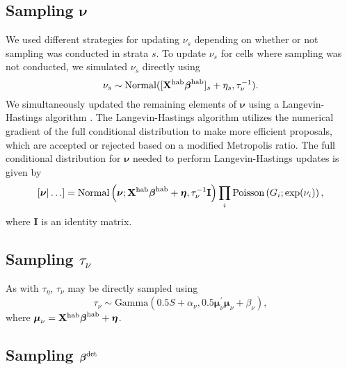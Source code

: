 \documentclass[10pt]{article}
\begin{document}
\subsection*{Sampling $\boldsymbol{\nu}$}
We used different strategies for updating $\nu_s$ depending on whether or not sampling was conducted in strata $s$. To update $\nu_s$ for cells where sampling was not conducted, we simulated $\nu_s$ directly using
$$
\nu_s \sim {\rm Normal}([{\bf X}^{\rm hab} \boldsymbol{\beta}^{\rm hab}]_s+\eta_s,\tau_\nu^{-1}).
$$
We simultaneously updated the remaining elements of $\boldsymbol{\nu}$ using
a Langevin-Hastings algorithm \cite{RobertCasella2004}.  The Langevin-Hastings algorithm utilizes the numerical gradient of the full conditional distribution to make more efficient proposals, which are accepted or rejected based on a modified Metropolis ratio.  The full conditional distribution for $\boldsymbol{\nu}$ needed to perform Langevin-Hastings updates is given by
$$
\left[ \boldsymbol{\nu} | \hdots \right] = \textrm{Normal}\left(\boldsymbol{\nu};{\bf X}^{\rm hab}\boldsymbol{\beta}^{\rm hab}+\boldsymbol{\eta},\tau_\nu^{-1} {\bf I} \right) \prod_i \textrm{Poisson} \left( G_i; \exp(\nu_i) \right),
$$
where {\bf I} is an identity matrix.

\subsection*{Sampling $\tau_\nu$}
As with $\tau_\eta$, $\tau_\nu$ may be directly sampled using
$$
\tau_\nu \sim \textrm{Gamma}\left( 0.5S+\alpha_\nu,0.5\boldsymbol{\mu}_\nu^\prime \boldsymbol{\mu}_\nu+\beta_\nu \right),
$$
where $\boldsymbol{\mu}_\nu={\bf X}^{\rm hab}\boldsymbol{\beta}^{\rm hab}+\boldsymbol{\eta}$.

\subsection*{Sampling $\boldsymbol{\beta}^{\rm det}$}
\end{document}
